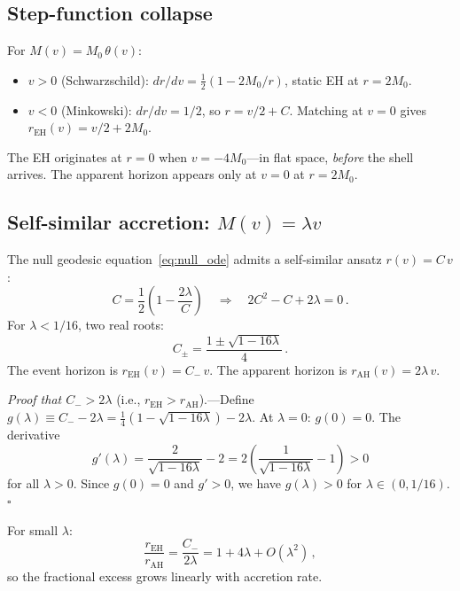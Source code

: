 \documentclass[prl,twocolumn,superscriptaddress,longbibliography,floatfix]{revtex4-2}
\begin{document}
\subsection{Step-function collapse}

For $M(v) = M_0\,\theta(v)$:
\begin{itemize}
\item $v > 0$ (Schwarzschild):
  $dr/dv = \frac{1}{2}(1 - 2M_0/r)$, static EH at
  $r = 2M_0$.
\item $v < 0$ (Minkowski): $dr/dv = 1/2$, so
  $r = v/2 + C$.  Matching at $v = 0$ gives
  $r_{\text{EH}}(v) = v/2 + 2M_0$.
\end{itemize}
The EH originates at $r = 0$ when $v = -4M_0$---in flat
space, \emph{before} the shell arrives.  The apparent
horizon appears only at $v = 0$ at $r = 2M_0$.

\subsection{Self-similar accretion: $M(v) = \lambda v$}
\label{sec:selfsimilar}

The null geodesic equation~\eqref{eq:null_ode} admits a
self-similar ansatz $r(v) = C\,v$:
\begin{equation}
  C = \frac{1}{2}\!\left(1 - \frac{2\lambda}{C}\right)
  \quad\Longrightarrow\quad
  2C^2 - C + 2\lambda = 0\,.
  \label{eq:selfsimilar}
\end{equation}
For $\lambda < 1/16$, two real roots:
\begin{equation}
  C_{\pm} = \frac{1 \pm \sqrt{1 - 16\lambda}}{4}\,.
  \label{eq:Cpm}
\end{equation}
The event horizon is $r_{\text{EH}}(v) = C_{-}\,v$.
The apparent horizon is $r_{\text{AH}}(v) = 2\lambda\,v$.

\emph{Proof that $C_{-} > 2\lambda$} (i.e.,
$r_{\text{EH}} > r_{\text{AH}}$).---Define
$g(\lambda) \equiv C_{-} - 2\lambda
= \frac{1}{4}(1 - \sqrt{1-16\lambda}) - 2\lambda$.
At $\lambda = 0$: $g(0) = 0$.
The derivative
\begin{equation}
  g'(\lambda) = \frac{2}{\sqrt{1-16\lambda}} - 2
  = 2\!\left(\frac{1}{\sqrt{1-16\lambda}} - 1\right)
  > 0
\end{equation}
for all $\lambda > 0$.  Since $g(0) = 0$ and
$g' > 0$, we have $g(\lambda) > 0$ for
$\lambda \in (0, 1/16)$.  \hfill$\square$

For small $\lambda$:
\begin{equation}
  \frac{r_{\text{EH}}}{r_{\text{AH}}}
  = \frac{C_{-}}{2\lambda}
  = 1 + 4\lambda + O(\lambda^2)\,,
\end{equation}
so the fractional excess grows linearly with accretion
rate.
\end{document}
